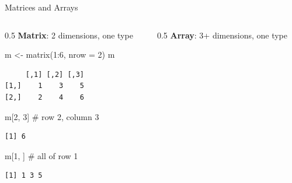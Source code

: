 \documentclass[
  ignorenonframetext,
  aspectratio=169,
]{beamer}
\newenvironment{Shaded}{\begin{snugshade}}{\end{snugshade}}
\newcommand{\AttributeTok}[1]{\textcolor[rgb]{0.40,0.45,0.13}{#1}}
\newcommand{\CommentTok}[1]{\textcolor[rgb]{0.37,0.37,0.37}{#1}}
\newcommand{\DecValTok}[1]{\textcolor[rgb]{0.68,0.00,0.00}{#1}}
\newcommand{\FunctionTok}[1]{\textcolor[rgb]{0.28,0.35,0.67}{#1}}
\newcommand{\NormalTok}[1]{\textcolor[rgb]{0.00,0.23,0.31}{#1}}
\newcommand{\OtherTok}[1]{\textcolor[rgb]{0.00,0.23,0.31}{#1}}
\newcommand{\SpecialCharTok}[1]{\textcolor[rgb]{0.37,0.37,0.37}{#1}}
\begin{document}
\begin{frame}[fragile]{Matrices and Arrays}
\protect\hypertarget{matrices-and-arrays}{}
\begin{columns}[T]
\begin{column}{0.5\textwidth}
\textbf{Matrix}: 2 dimensions, one type

\begin{Shaded}
\begin{Highlighting}[]
\NormalTok{m }\OtherTok{\textless{}{-}} \FunctionTok{matrix}\NormalTok{(}\DecValTok{1}\SpecialCharTok{:}\DecValTok{6}\NormalTok{, }\AttributeTok{nrow =} \DecValTok{2}\NormalTok{)}
\NormalTok{m}
\end{Highlighting}
\end{Shaded}

\begingroup\tiny\color{darkgray}

\begin{verbatim}
     [,1] [,2] [,3]
[1,]    1    3    5
[2,]    2    4    6
\end{verbatim}

\endgroup

\begin{Shaded}
\begin{Highlighting}[]
\NormalTok{m[}\DecValTok{2}\NormalTok{, }\DecValTok{3}\NormalTok{]     }\CommentTok{\# row 2, column 3}
\end{Highlighting}
\end{Shaded}

\begingroup\tiny\color{darkgray}

\begin{verbatim}
[1] 6
\end{verbatim}

\endgroup

\begin{Shaded}
\begin{Highlighting}[]
\NormalTok{m[}\DecValTok{1}\NormalTok{, ]      }\CommentTok{\# all of row 1}
\end{Highlighting}
\end{Shaded}

\begingroup\tiny\color{darkgray}

\begin{verbatim}
[1] 1 3 5
\end{verbatim}

\endgroup
\end{column}

\begin{column}{0.5\textwidth}
\textbf{Array}: 3+ dimensions, one type


\end{column}
\end{columns}
\end{frame}
\end{document}
